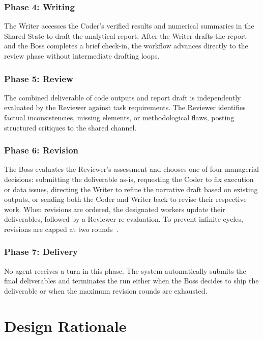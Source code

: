 \subsubsection{Phase 4: Writing}
\label{subsubsec:phase-4-writing}

The Writer accesses the Coder's verified results and numerical summaries in the Shared State to draft the analytical report.
After the Writer drafts the report and the Boss completes a brief check-in, the workflow advances directly to the review phase without intermediate drafting loops.

\subsubsection{Phase 5: Review}
\label{subsubsec:phase-5-review}

The combined deliverable of code outputs and report draft is independently evaluated by the Reviewer against task requirements.
The Reviewer identifies factual inconsistencies, missing elements, or methodological flaws, posting structured critiques to the shared channel.

\subsubsection{Phase 6: Revision}
\label{subsubsec:phase-6-revision}

The Boss evaluates the Reviewer's assessment and chooses one of four managerial decisions:
submitting the deliverable as-is,
requesting the Coder to fix execution or data issues,
directing the Writer to refine the narrative draft based on existing outputs,
or sending both the Coder and Writer back to revise their respective work.
When revisions are ordered, the designated workers update their deliverables, followed by a Reviewer re-evaluation.
To prevent infinite cycles, revisions are capped at two rounds~\cite{qian2024chatdevcommunicativeagentssoftware}.

\subsubsection{Phase 7: Delivery}
\label{subsubsec:phase-7-delivery}

No agent receives a turn in this phase.
The system automatically submits the final deliverables and terminates the run either when the Boss decides to ship the deliverable or when the maximum revision rounds are exhausted.

\section{Design Rationale}
\label{sec:design-rationale}

